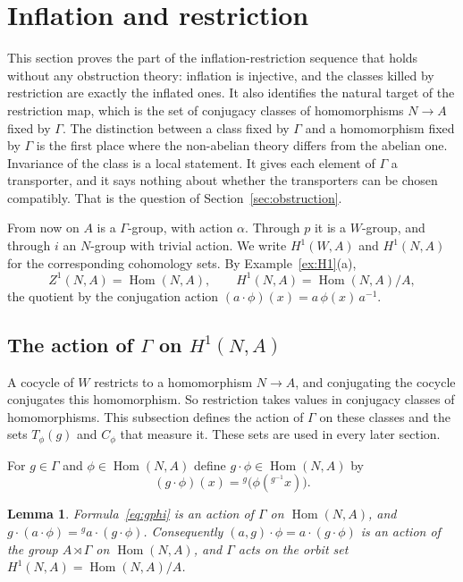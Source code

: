 \documentclass[12pt,letterpaper]{article}
\numberwithin{equation}{section}
\theoremstyle{plain}
\newtheorem{lemma}[theorem]{Lemma}
\theoremstyle{definition}
\newcommand{\act}[2]{{}^{#1}\!#2}          %
\DeclareMathOperator{\Hom}{Hom}
\begin{document}
\section{Inflation and restriction}\label{sec:infres}

This section proves the part of the inflation-restriction sequence that
holds without any obstruction theory: inflation is injective, and the
classes killed by restriction are exactly the inflated ones. It also
identifies the natural target of the restriction map, which is the set of
conjugacy classes of homomorphisms $N\to A$ fixed by $\Gamma$. The
distinction between a class fixed by $\Gamma$ and a homomorphism fixed by
$\Gamma$ is the first place where the non-abelian theory differs from the
abelian one. Invariance of the class is a local statement. It gives each
element of $\Gamma$ a transporter, and it says nothing about whether the
transporters can be chosen compatibly. That is the question of
Section~\ref{sec:obstruction}.

From now on $A$ is a $\Gamma$-group, with action $\alpha$. Through $p$ it
is a $W$-group, and through $i$ an $N$-group with trivial action. We write
$H^1(W,A)$ and $H^1(N,A)$ for the corresponding cohomology sets. By
Example~\ref{ex:H1}(a),
\[
Z^1(N,A)=\Hom(N,A),\qquad H^1(N,A)=\Hom(N,A)/A ,
\]
the quotient by the conjugation action $(a\cdot\phi)(x)=a\,\phi(x)\,a^{-1}$.

\subsection{The action of \texorpdfstring{$\Gamma$}{Gamma} on \texorpdfstring{$H^1(N,A)$}{H1(N,A)}}

A cocycle of $W$ restricts to a homomorphism $N\to A$, and conjugating
the cocycle conjugates this homomorphism. So restriction takes values in
conjugacy classes of homomorphisms. This subsection defines the action of
$\Gamma$ on these classes and the sets $T_\phi(g)$ and $C_\phi$ that
measure it. These sets are used in every later section.

For $g\in\Gamma$ and $\phi\in\Hom(N,A)$ define $g\cdot\phi\in\Hom(N,A)$ by
\begin{equation}\label{eq:gphi}
(g\cdot\phi)(x)=\act{g}{\bigl(\phi(\act{g^{-1}}{x})\bigr)} .
\end{equation}

\begin{lemma}\label{lem:actions}
Formula~\eqref{eq:gphi} is an action of $\Gamma$ on $\Hom(N,A)$, and
$g\cdot(a\cdot\phi)=\act{g}{a}\cdot(g\cdot\phi)$. Consequently
$(a,g)\cdot\phi=a\cdot(g\cdot\phi)$ is an action of the group
$A\rtimes\Gamma$ on $\Hom(N,A)$, and $\Gamma$ acts on the orbit set
$H^1(N,A)=\Hom(N,A)/A$.
\end{lemma}
\end{document}
